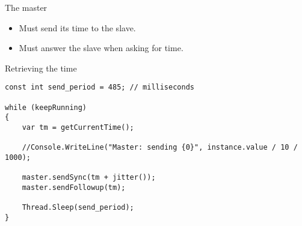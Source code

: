\documentclass[compressed, presentation, notheorems, 12pt]{beamer}
\begin{document}
	\begin{frame}{The master}
	\begin{itemize}
		\item Must send its time to the slave.
		\item Must answer the slave when asking for time.
	\end{itemize}
	\end{frame}


	\begin{frame}[containsverbatim]{Retrieving the time}
	\begin{lstlisting}[style=Code-C++]
const int send_period = 485; // milliseconds

while (keepRunning)
{
	var tm = getCurrentTime();

	//Console.WriteLine("Master: sending {0}", instance.value / 10 / 1000);

	master.sendSync(tm + jitter());
	master.sendFollowup(tm);						

	Thread.Sleep(send_period);
}
	\end{lstlisting}
	\end{frame}

 	
\end{document}
